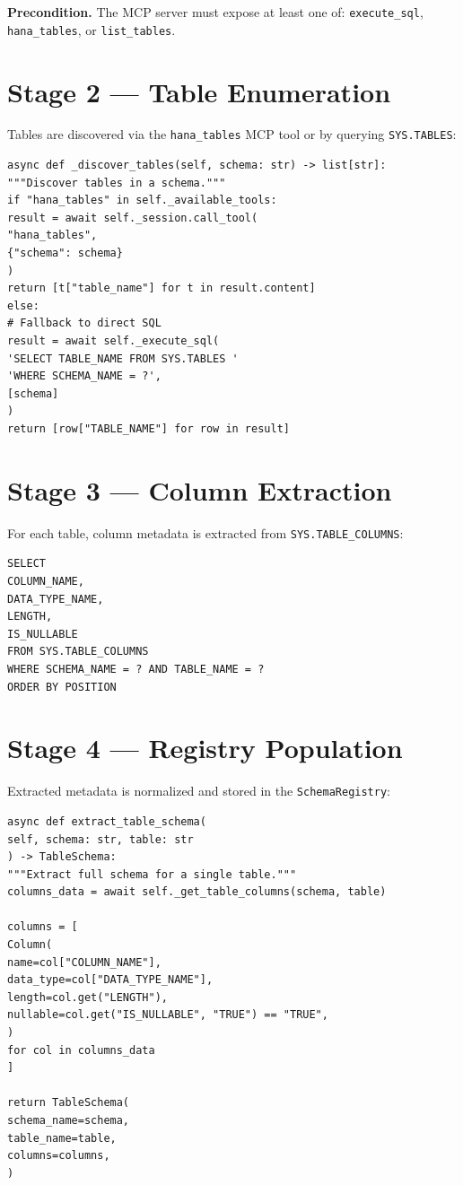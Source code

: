 \documentclass[12pt,a4paper,twoside]{report}
\begin{document}
\textbf{Precondition.} The MCP server must expose at least one of: \texttt{execute\_sql},
\texttt{hana\_tables}, or \texttt{list\_tables}.

\section{Stage 2 --- Table Enumeration}

Tables are discovered via the \texttt{hana\_tables} MCP tool or by querying
\texttt{SYS.TABLES}:

\begin{lstlisting}[language=jsonx,caption={Table discovery (hana\_schema\_extractor.py, lines 85--105)}]
async def _discover_tables(self, schema: str) -> list[str]:
"""Discover tables in a schema."""
if "hana_tables" in self._available_tools:
result = await self._session.call_tool(
"hana_tables",
{"schema": schema}
)
return [t["table_name"] for t in result.content]
else:
# Fallback to direct SQL
result = await self._execute_sql(
'SELECT TABLE_NAME FROM SYS.TABLES '
'WHERE SCHEMA_NAME = ?',
[schema]
)
return [row["TABLE_NAME"] for row in result]
\end{lstlisting}

\section{Stage 3 --- Column Extraction}

For each table, column metadata is extracted from \texttt{SYS.TABLE\_COLUMNS}:

\begin{lstlisting}[language=jsonx,caption={Column extraction SQL}]
SELECT
COLUMN_NAME,
DATA_TYPE_NAME,
LENGTH,
IS_NULLABLE
FROM SYS.TABLE_COLUMNS
WHERE SCHEMA_NAME = ? AND TABLE_NAME = ?
ORDER BY POSITION
\end{lstlisting}

\section{Stage 4 --- Registry Population}

Extracted metadata is normalized and stored in the \texttt{SchemaRegistry}:

\begin{lstlisting}[language=jsonx,caption={Registry population (hana\_schema\_extractor.py, lines 140--165)}]
async def extract_table_schema(
self, schema: str, table: str
) -> TableSchema:
"""Extract full schema for a single table."""
columns_data = await self._get_table_columns(schema, table)

columns = [
Column(
name=col["COLUMN_NAME"],
data_type=col["DATA_TYPE_NAME"],
length=col.get("LENGTH"),
nullable=col.get("IS_NULLABLE", "TRUE") == "TRUE",
)
for col in columns_data
]

return TableSchema(
schema_name=schema,
table_name=table,
columns=columns,
)
\end{lstlisting}
\end{document}
